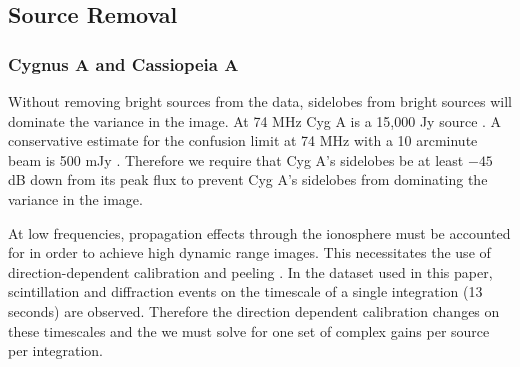 \documentclass[twocolumn]{aastex61}
\begin{document}
\subsection{Source Removal}

\subsubsection{Cygnus A and Cassiopeia A}


Without removing bright sources from the data, sidelobes from bright sources will dominate the
variance in the image.  At 74 MHz Cyg A is a 15,000 Jy source \citep{1977A&A....61...99B}. A
conservative estimate for the confusion limit at 74 MHz with a 10 arcminute beam is 500 mJy
\citep{2012RaSc...47.0K04L}. Therefore we require that Cyg A's sidelobes be at least $-45$ dB down
from its peak flux to prevent Cyg A's sidelobes from dominating the variance in the image.

At low frequencies, propagation effects through the ionosphere must be accounted for in order to
achieve high dynamic range images. This necessitates the use of direction-dependent calibration and
peeling \citep{2008ISTSP...2..707M, 2015MNRAS.449.2668S}.  In the dataset used in this paper,
scintillation and diffraction events on the timescale of a single integration (13 seconds) are
observed. Therefore the direction dependent calibration changes on these timescales and the we must
solve for one set of complex gains per source per integration.
\end{document}

